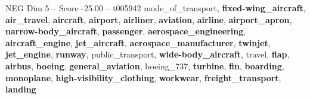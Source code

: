 \begin{textsample}{NEG Dim 5 – Score -25.00 – t005942}  \label{ex:f5_neg_004}
mode\_of\_transport, \textbf{fixed-wing\_aircraft}, \textbf{air\_travel}, \textbf{aircraft}, \textbf{airport}, \textbf{airliner}, \textbf{aviation}, \textbf{airline}, \textbf{airport\_apron}, \textbf{narrow-body\_aircraft}, \textbf{passenger}, \textbf{aerospace\_engineering}, \textbf{aircraft\_engine}, \textbf{jet\_aircraft}, \textbf{aerospace\_manufacturer}, \textbf{twinjet}, \textbf{jet\_engine}, \textbf{runway}, public\_transport, \textbf{wide-body\_aircraft}, travel, \textbf{flap}, \textbf{airbus}, \textbf{boeing}, \textbf{general\_aviation}, boeing\_737, \textbf{turbine}, \textbf{fin}, \textbf{boarding}, \textbf{monoplane}, \textbf{high-visibility\_clothing}, \textbf{workwear}, \textbf{freight\_transport}, \textbf{landing}

\end{textsample}
